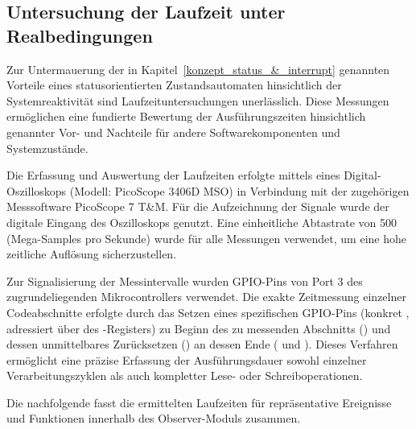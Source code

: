 
\subsection{Untersuchung der Laufzeit unter Realbedingungen}
\label{laufzeit}

Zur Untermauerung der in Kapitel~\ref{konzept_status_&_interrupt} genannten Vorteile eines statusorientierten Zustandsautomaten hinsichtlich der Systemreaktivit\"at sind Laufzeituntersuchungen unerl\"asslich. Diese Messungen erm\"oglichen eine fundierte Bewertung der Ausf\"uhrungszeiten hinsichtlich genannter Vor- und Nachteile f\"ur andere Softwarekomponenten und Systemzust\"ande.

Die Erfassung und Auswertung der Laufzeiten erfolgte mittels eines Digital-Oszilloskops (Modell: PicoScope 3406D MSO) in Verbindung mit der zugeh\"origen Messsoftware PicoScope 7 T\&M. F\"ur die Aufzeichnung der Signale wurde der digitale Eingang  des Oszilloskops genutzt. Eine einheitliche Abtastrate von 500  (Mega-Samples pro Sekunde) wurde f\"ur alle Messungen verwendet, um eine hohe zeitliche Aufl\"osung sicherzustellen.

Zur Signalisierung der Messintervalle wurden GPIO-Pins von Port 3 des zugrundeliegenden Mikrocontrollers verwendet. Die exakte Zeitmessung einzelner Codeabschnitte erfolgte durch das Setzen eines spezifischen GPIO-Pins (konkret , adressiert \"uber  des -Registers) zu Beginn des zu messenden Abschnitts () und dessen unmittelbares Zur\"ucksetzen () an dessen Ende (\Vgl {} und ). Dieses Verfahren erm\"oglicht eine pr\"azise Erfassung der Ausf\"uhrungsdauer sowohl einzelner Verarbeitungszyklen als auch kompletter Lese- oder Schreiboperationen.

Die nachfolgende  fasst die ermittelten Laufzeiten f\"ur repr\"asentative Ereignisse und Funktionen innerhalb des Observer-Moduls zusammen.

